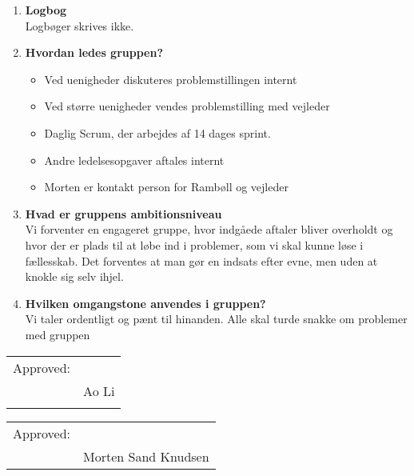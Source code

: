 \begin{enumerate}
		\item \textbf{Logbog}\\
			Logbøger skrives ikke.
			\vspace{1cm}
		\item \textbf{Hvordan ledes gruppen?}
			\begin{itemize}[-]
				\itemsep 0.3em
					\item Ved uenigheder diskuteres problemstillingen internt
					\item Ved større uenigheder vendes problemstilling med vejleder
				\item Daglig Scrum, der arbejdes af 14 dages sprint.
				\item Andre ledelsesopgaver aftales internt
				\item Morten er kontakt person for Rambøll og vejleder
				\vspace{1cm}
			\end{itemize}
		
		\item \textbf{Hvad er gruppens ambitionsniveau} \\
				Vi forventer en engageret gruppe, hvor indgåede aftaler bliver overholdt og hvor der er plads til at løbe ind i problemer, som vi skal kunne løse i fællesskab.
				Det forventes at man gør en indsats efter evne, men uden at knokle sig selv ihjel.
				\vspace{1cm}
		
		\item \textbf{Hvilken omgangstone anvendes i gruppen?}\\
				Vi taler ordentligt og pænt til hinanden. Alle skal turde snakke om problemer med gruppen
				\vspace{1cm}
			
	\end{enumerate}

\begin{tabular}{@{}p{.5in}p{4in}@{}}
	Approved: & \hrulefill \\
	& Ao Li \\ \\
\end{tabular}


\begin{tabular}{@{}p{.5in}p{4in}@{}}
	Approved: & \hrulefill \\
	& Morten Sand Knudsen \\
\end{tabular}		

